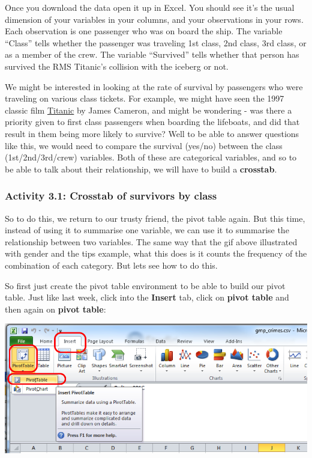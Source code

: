 \documentclass[
]{book}
\begin{document}
Once you download the data open it up in Excel. You should see it's the usual dimension of your variables in your columns, and your observations in your rows. Each observation is one passenger who was on board the ship. The variable ``Class'' tells whether the passenger was traveling 1st class, 2nd class, 3rd class, or as a member of the crew. The variable ``Survived'' tells whether that person has survived the RMS Titanic's collision with the iceberg or not.

We might be interested in looking at the rate of survival by passengers who were traveling on various class tickets. For example, we might have seen the 1997 classic film \href{http://www.imdb.com/title/tt0120338/}{Titanic} by James Cameron, and might be wondering - was there a priority given to first class passengers when boarding the lifeboats, and did that result in them being more likely to survive? Well to be able to answer questions like this, we would need to compare the survival (yes/no) between the class (1st/2nd/3rd/crew) variables. Both of these are categorical variables, and so to be able to talk about their relationship, we will have to build a \textbf{crosstab}.

\hypertarget{activity-3.1-crosstab-of-survivors-by-class}{%
\subsubsection{Activity 3.1: Crosstab of survivors by class}\label{activity-3.1-crosstab-of-survivors-by-class}}

So to do this, we return to our trusty friend, the pivot table again. But this time, instead of using it to summarise one variable, we can use it to summarise the relationship between two variables. The same way that the gif above illustrated with gender and the tips example, what this does is it counts the frequency of the combination of each category. But lets see how to do this.

So first just create the pivot table environment to be able to build our pivot table. Just like last week, click into the \textbf{Insert} tab, click on \textbf{pivot table} and then again on \textbf{pivot table}:

\includegraphics{imgs/click_pivot.png}
\end{document}
